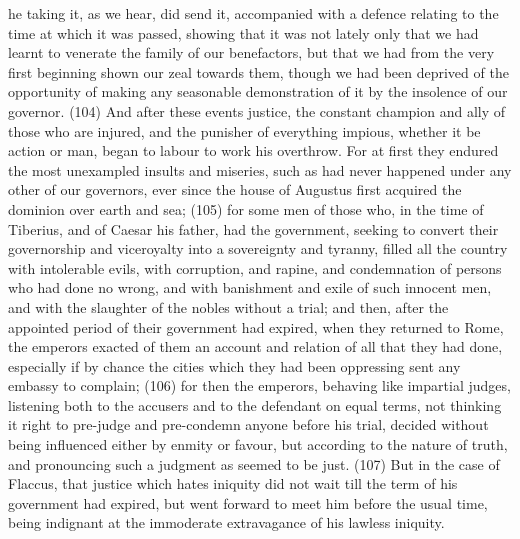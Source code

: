 he taking it, as we hear, did send it, accompanied with a defence relating to the time at which it was
passed, showing that it was not lately only that we had learnt to venerate the family of our
benefactors, but that we had from the very first beginning shown our zeal towards them, though we
had been deprived of the opportunity of making any seasonable demonstration of it by the
insolence of our governor. (104) And after these events justice, the constant champion and ally of
those who are injured, and the punisher of everything impious, whether it be action or man, began
to labour to work his overthrow. For at first they endured the most unexampled insults and
miseries, such as had never happened under any other of our governors, ever since the house of
Augustus first acquired the dominion over earth and sea; (105) for some men of those who, in the
time of Tiberius, and of Caesar his father, had the government, seeking to convert their
governorship and viceroyalty into a sovereignty and tyranny, filled all the country with intolerable
evils, with corruption, and rapine, and condemnation of persons who had done no wrong, and with
banishment and exile of such innocent men, and with the slaughter of the nobles without a trial; and
then, after the appointed period of their government had expired, when they returned to Rome, the
emperors exacted of them an account and relation of all that they had done, especially if by
chance the cities which they had been oppressing sent any embassy to complain; (106) for then
the emperors, behaving like impartial judges, listening both to the accusers and to the defendant on
equal terms, not thinking it right to pre-judge and pre-condemn anyone before his trial, decided
without being influenced either by enmity or favour, but according to the nature of truth, and
pronouncing such a judgment as seemed to be just. (107) But in the case of Flaccus, that justice
which hates iniquity did not wait till the term of his government had expired, but went forward to
meet him before the usual time, being indignant at the immoderate extravagance of his lawless
iniquity.

